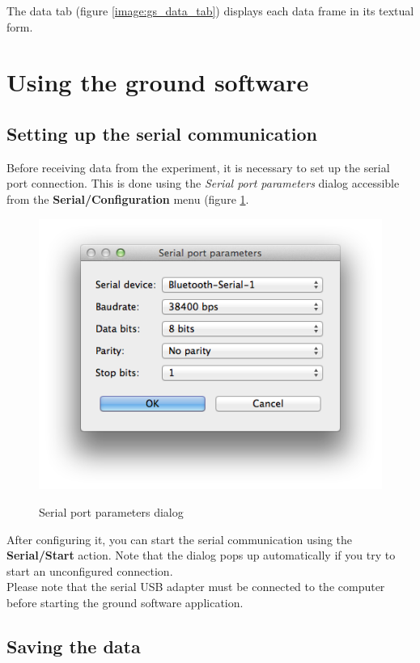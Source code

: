 \documentclass[11pt,a4paper,oneside]{report}
\begin{document}
The data tab (figure \ref{image:gs_data_tab}) displays each data frame in its textual form.

\section{Using the ground software}

\subsection{Setting up the serial communication}

Before receiving data from the experiment, it is necessary to set up the serial port connection.
This is done using the \emph{Serial port parameters} dialog accessible from the \textbf{Serial/Configuration} menu (figure \ref{image:gs_serial_parameters}.

\begin{figure}[!h]
\center
\includegraphics[scale=0.6]{images/gs_serial_parameters.png}
\label{image:gs_serial_parameters}
\caption{Serial port parameters dialog}
\end{figure}

After configuring it, you can start the serial communication using the \textbf{Serial/Start} action.
Note that the dialog pops up automatically if you try to start an unconfigured connection. \\

Please note that the serial USB adapter must be connected to the computer before starting the ground software application.

\subsection{Saving the data}
\end{document}

